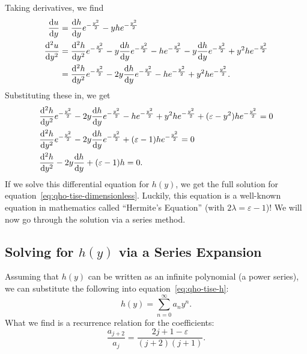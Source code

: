 \documentclass[../quantum_mechanics.tex]{subfiles}
\begin{document}
            Taking derivatives, we find
            \begin{align}
                \dv{u}{y}&=\dv{h}{y}e^{-\frac{y^2}{2}}-yhe^{-\frac{y^2}{2}}\\
                \dv[2]{u}{y}&=\dv[2]{h}{y}e^{-\frac{y^2}{2}}-y\dv{h}{y}e^{-\frac{y^2}{2}}-he^{-\frac{y^2}{2}}-y\dv{h}{y}e^{-\frac{y^2}{2}}+y^2he^{-\frac{y^2}{2}}\\
                &=\dv[2]{h}{y}e^{-\frac{y^2}{2}}-2y\dv{h}{y}e^{-\frac{y^2}{2}}-he^{-\frac{y^2}{2}}+y^2he^{-\frac{y^2}{2}}.
            \end{align}
            Substituting these in, we get
            \begin{align}
                &\dv[2]{h}{y}e^{-\frac{y^2}{2}}-2y\dv{h}{y}e^{-\frac{y^2}{2}}-he^{-\frac{y^2}{2}}+y^2he^{-\frac{y^2}{2}}+(\varepsilon-y^2)he^{-\frac{y^2}{2}}=0\\
                &\dv[2]{h}{y}e^{-\frac{y^2}{2}}-2y\dv{h}{y}e^{-\frac{y^2}{2}}+(\varepsilon-1)he^{-\frac{y^2}{2}}=0\\
                &\dv[2]{h}{y}-2y\dv{h}{y}+(\varepsilon-1)h=0\label{eq:qho-tise-h}.
            \end{align}
            If we solve this differential equation for $h(y)$, we get the full solution for equation~\ref{eq:qho-tise-dimensionless}.
            Luckily, this equation is a well-known equation in mathematics called ``Hermite's Equation'' (with $2\lambda=\varepsilon-1$)!
            We will now go through the solution via a series method.
        
        \subsection{Solving for $h(y)$ via a Series Expansion}\label{sec:solving-the-quantum-harmonic-oscillator:subsec:solving-for-h(y)-via-a-series-expansion}
            Assuming that $h(y)$ can be written as an infinite polynomial (a power series), we can substitute the following into equation~\ref{eq:qho-tise-h}:
            \begin{equation}
                h(y)=\sum_{n=0}^\infty a_ny^n.
            \end{equation}
            What we find is a recurrence relation for the coefficients:
            \begin{equation}
                \frac{a_{j+2}}{a_j}=\frac{2j+1-\varepsilon}{(j+2)(j+1)}.
            \end{equation}
\end{document}
